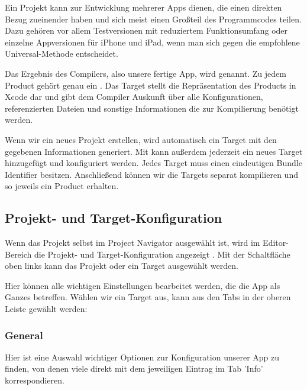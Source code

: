 \documentclass[parskip=half, final]{scrreprt}
\begin{document}
Ein Projekt kann zur Entwicklung mehrerer Apps dienen, die einen direkten Bezug zueinender haben und sich meist einen Großteil des Programmcodes teilen. Dazu gehören vor allem Testversionen mit reduziertem Funktionsumfang oder einzelne Appversionen für iPhone und iPad, wenn man sich gegen die empfohlene Universal-Methode entscheidet.

Das Ergebnis des Compilers, also unsere fertige App, wird  genannt. Zu jedem Product gehört genau ein . Das Target stellt die Repräsentation des Products in Xcode dar und gibt dem Compiler Auskunft über alle Konfigurationen, referenzierten Dateien und sonstige Informationen die zur Kompilierung benötigt werden.

Wenn wir ein neues Projekt erstellen, wird automatisch ein Target mit den gegebenen Informationen generiert. Mit  kann außerdem jederzeit ein neues Target hinzugefügt und konfiguriert werden. Jedes Target muss einen eindeutigen Bundle Identifier besitzen. Anschließend können wir die Targets separat kompilieren und so jeweils ein Product erhalten.

\subsection{Projekt- und Target-Konfiguration}\label{sec:projkonfig}

Wenn das Projekt selbst im Project Navigator  ausgewählt ist, wird im Editor-Bereich die Projekt- und Target-Konfiguration angezeigt . Mit der Schaltfläche oben links kann das Projekt oder ein Target ausgewählt werden.


Hier können alle wichtigen Einstellungen bearbeitet werden, die die App als Ganzes betreffen. Wählen wir ein Target aus, kann aus den Tabs in der oberen Leiste gewählt werden:

\subsubsection{General}

Hier ist eine Auswahl wichtiger Optionen zur Konfiguration unserer App zu finden, von denen viele direkt mit dem jeweiligen Eintrag im Tab 'Info' korrespondieren.
\end{document}
